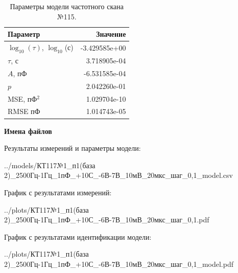 \begin{table}[!ht]
    \centering
    \caption{Параметры модели частотного скана №115.}
    \begin{tabular}{|l|r|}
        \hline
        Параметр                                       & Значение                  \\ \hline
        $\log_{10}(\tau)$, $\log_{10}$(с)              & -3.429585e+00             \\ \hline
        $\tau$, с                                      & 3.718905e-04              \\ \hline
        $A$, пФ                                        & -6.531585e-04             \\ \hline
        $p$                                            & 2.042260e-01              \\ \hline
        MSE, пФ$^2$                                    & 1.029704e-10              \\ \hline
        RMSE пФ                                        & 1.014743e-05              \\ \hline
    \end{tabular}
    \label{table:frequency_scan_model_115}
\end{table}

\textbf{Имена файлов}

Результаты измерений и параметры модели:

\scriptsize../models/КТ117№1\_п1(база 2)\_2500Гц-1Гц\_1пФ\_+10С\_-6В-7В\_10мВ\_20мкс\_шаг\_0,1\_model.csv
\normalsize

График с результатами измерений:

\scriptsize../plots/КТ117№1\_п1(база 2)\_2500Гц-1Гц\_1пФ\_+10С\_-6В-7В\_10мВ\_20мкс\_шаг\_0,1.pdf
\normalsize

График с результатами идентификации модели:

\scriptsize../plots/КТ117№1\_п1(база 2)\_2500Гц-1Гц\_1пФ\_+10С\_-6В-7В\_10мВ\_20мкс\_шаг\_0,1\_model.pdf
\normalsize

